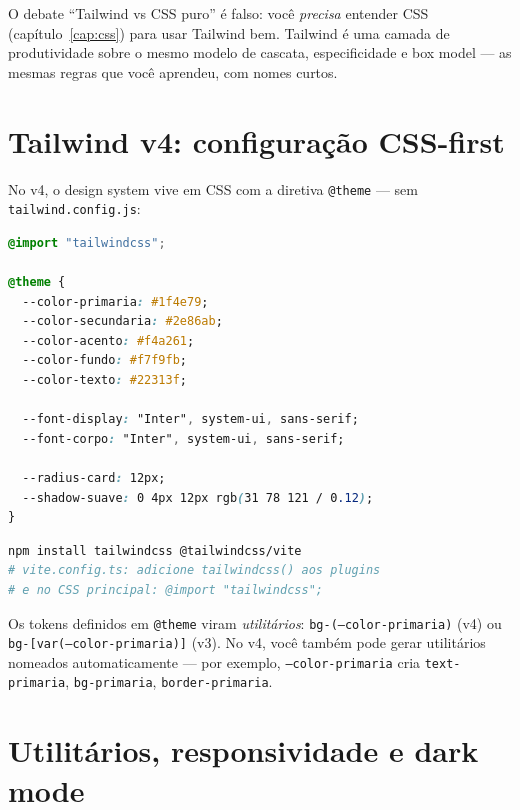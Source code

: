 \begin{caixaconceito}
O debate ``Tailwind vs CSS puro'' é falso: você \emph{precisa} entender CSS
(capítulo~\ref{cap:css}) para usar Tailwind bem. Tailwind é uma camada de
produtividade sobre o mesmo modelo de cascata, especificidade e box model —
as mesmas regras que você aprendeu, com nomes curtos.
\end{caixaconceito}

\section{Tailwind v4: configuração CSS-first}

No v4, o design system vive em CSS com a diretiva \texttt{@theme} — sem
\texttt{tailwind.config.js}:

\begin{lstlisting}[style=livro, language=CSS,
  caption={Tokens do design system no Tailwind v4.}, label={list:tailwind-tema}]
@import "tailwindcss";

@theme {
  --color-primaria: #1f4e79;
  --color-secundaria: #2e86ab;
  --color-acento: #f4a261;
  --color-fundo: #f7f9fb;
  --color-texto: #22313f;

  --font-display: "Inter", system-ui, sans-serif;
  --font-corpo: "Inter", system-ui, sans-serif;

  --radius-card: 12px;
  --shadow-suave: 0 4px 12px rgb(31 78 121 / 0.12);
}
\end{lstlisting}

\begin{lstlisting}[style=livro, language=Bash,
  caption={Instalando o Tailwind v4 no Vite.}, label={list:tailwind-instalar}]
npm install tailwindcss @tailwindcss/vite
# vite.config.ts: adicione tailwindcss() aos plugins
# e no CSS principal: @import "tailwindcss";
\end{lstlisting}

\begin{caixaconceito}
Os tokens definidos em \texttt{@theme} viram \emph{utilitários}:
\texttt{bg-(--color-primaria)} (v4) ou \texttt{bg-[var(--color-primaria)]}
(v3). No v4, você também pode gerar utilitários nomeados automaticamente —
por exemplo, \texttt{--color-primaria} cria \texttt{text-primaria},
\texttt{bg-primaria}, \texttt{border-primaria}.
\end{caixaconceito}

\section{Utilitários, responsividade e dark mode}

